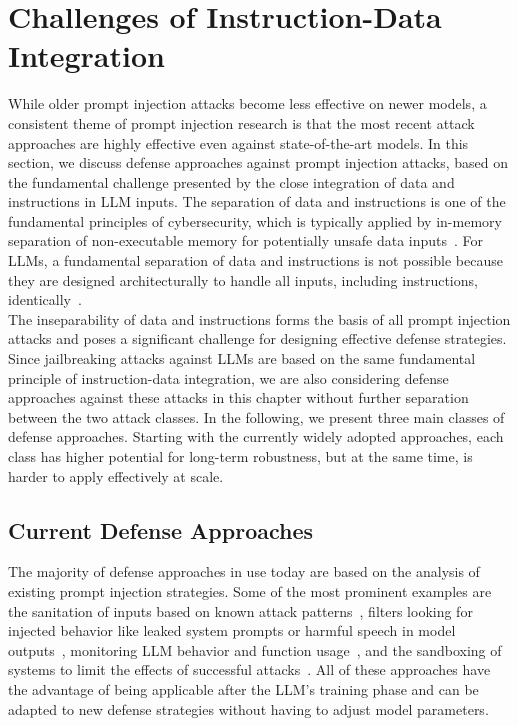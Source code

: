 \section{Challenges of Instruction-Data Integration} \label{sec:instruction_data}
While older prompt injection attacks become less effective on newer models, a consistent theme of prompt injection research is that the most recent attack approaches are highly effective even against state-of-the-art models.
In this section, we discuss defense approaches against prompt injection attacks, based on the fundamental challenge presented by the close integration of data and instructions in LLM inputs.
The separation of data and instructions is one of the fundamental principles of cybersecurity, which is typically applied by in-memory separation of non-executable memory for potentially unsafe data inputs~\cite{owasp_a05_nodate}.
For LLMs, a fundamental separation of data and instructions is not possible because they are designed architecturally to handle all inputs, including instructions, identically~\cite{kamath_prompt-based_2024}.\\

The inseparability of data and instructions forms the basis of all prompt injection attacks and poses a significant challenge for designing effective defense strategies.
Since jailbreaking attacks against LLMs are based on the same fundamental principle of instruction-data integration, we are also considering defense approaches against these attacks in this chapter without further separation between the two attack classes.
In the following, we present three main classes of defense approaches.
Starting with the currently widely adopted approaches, each class has higher potential for long-term robustness, but at the same time, is harder to apply effectively at scale.

\subsection{Current Defense Approaches} \label{sec:current_defenses}
The majority of defense approaches in use today are based on the analysis of existing prompt injection strategies.
Some of the most prominent examples are the sanitation of inputs based on known attack patterns~\cite{owasp_prompt_nodate}, filters looking for injected behavior like leaked system prompts or harmful speech in model outputs~\cite{hui_pleak_2024, ji_controlling_2023}, monitoring LLM behavior and function usage~\cite{owasp_prompt_nodate}, and the sandboxing of systems to limit the effects of successful attacks~\cite{debenedetti_defeating_2025}.
All of these approaches have the advantage of being applicable after the LLM's training phase and can be adapted to new defense strategies without having to adjust model parameters.\\

